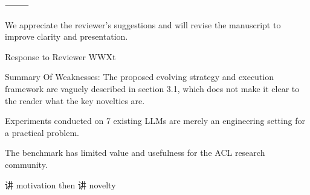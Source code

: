 ⸻

We appreciate the reviewer’s suggestions and will revise the manuscript to improve clarity and presentation.











Response to Reviewer WWXt

Summary Of Weaknesses:
The proposed evolving strategy and execution framework are vaguely described in section 3.1, which does not make it clear to the reader what the key novelties are.

Experiments conducted on 7 existing LLMs are merely an engineering setting for a practical problem.

The benchmark has limited value and usefulness for the ACL research community.

讲 motivation then 讲 novelty






